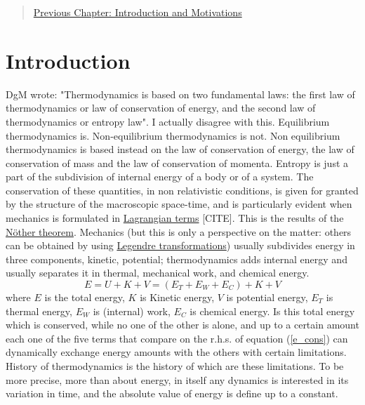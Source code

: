 \begin{quote}
\href{https://www.authorea.com/users/24891/articles/130803/_show_article}{Previous Chapter: Introduction  and Motivations}
\end{quote}

\section{Introduction}

DgM wrote: "Thermodynamics is based on two fundamental laws: the first law of thermodynamics or law of conservation of energy, and the second law of thermodynamics or entropy law".  I actually disagree with this. Equilibrium thermodynamics is. Non-equilibrium thermodynamics is not. Non equilibrium thermodynamics is based instead on the law of conservation of energy, the law of conservation of mass and the law of conservation of momenta. Entropy is just a part of the subdivision of internal energy of a body or of a system. The conservation of these quantities, in non relativistic conditions, is given for granted by the structure of the macroscopic space-time, and is particularly evident when mechanics is formulated in \href{https://en.wikipedia.org/wiki/Lagrangian_mechanics}{Lagrangian terms} [CITE]. This is the results of the \href{https://en.wikipedia.org/wiki/Noether%27s_theorem}{Nöther theorem}. 
Mechanics (but this is only a perspective on the matter: others can be obtained by using \href{https://en.wikipedia.org/wiki/Legendre_transformation}{Legendre transformations}) usually subdivides energy in three components, kinetic, potential; thermodynamics adds internal  energy and usually separates it in thermal, mechanical work, and chemical energy.
\begin{equation}
E = U  + K + V = (E_T + E_W + E_C) + K + V
\label{e_cons}
\end{equation}
where $E$ is the total energy, $K$ is Kinetic energy, $V$ is potential energy, $E_T$ is thermal energy, $E_W$ is (internal) work, $E_C$ is chemical energy. Is this total energy which is conserved, while no one of the other is alone, and up to a certain amount each one of the five terms that compare on the r.h.s. of equation (\ref{e_cons}) can dynamically exchange energy amounts with the others with certain limitations. 
History of thermodynamics is the history of which are these limitations. To be more precise, more than about energy, in itself any dynamics is interested in its variation in time, and the absolute value of energy is define up to a constant. 
